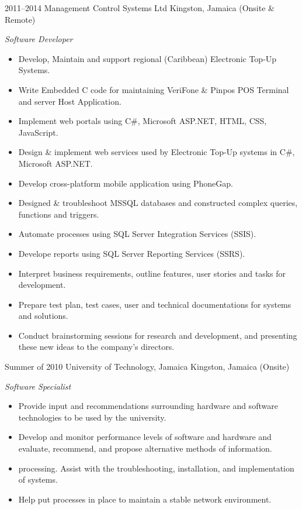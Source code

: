 \documentclass[]{friggeri-cvRS}
\begin{document}
\begin{entrylist}
{\begin{itemize}
    \end{itemize}}
  \entry
    {2011--2014}
    {Management Control Systems Ltd}
    {Kingston, Jamaica (Onsite \& Remote)}
    {\emph{Software Developer}
    \begin{itemize}
	\item Develop, Maintain and support regional (Caribbean) Electronic Top-Up Systems.
	\item Write Embedded C code for maintaining VeriFone \& Pinpos POS Terminal and server Host Application.
	\item Implement web portals using C\#, Microsoft ASP.NET, HTML, CSS, JavaScript.
	\item Design \& implement web services used by Electronic Top-Up systems in C\#, Microsoft ASP.NET.
	\item Develop cross-platform mobile application using PhoneGap.
	\item Designed \& troubleshoot MSSQL databases and constructed complex queries, functions and triggers.
	\item Automate processes using SQL Server Integration Services (SSIS).
	\item Develope reports using SQL Server Reporting Services (SSRS).
	\item Interpret business requirements, outline features, user stories and tasks for development.
	\item Prepare test plan, test cases, user and technical documentations for systems and solutions.
	\item Conduct brainstorming sessions for research and development, and presenting these new ideas to the company’s directors.\\
	 
    \end{itemize}}
  \entry
    {Summer of 2010}
    {University of Technology, Jamaica}
    {Kingston, Jamaica (Onsite)}
    {\emph{Software Specialist}
    \begin{itemize}
	\item Provide input and recommendations surrounding hardware and software technologies to be used by the university.
	\item Develop and monitor performance levels of software and hardware and evaluate, recommend, and propose alternative methods of information.		\item processing.  Assist with the troubleshooting, installation, and implementation of systems.
	\item Help put processes in place to maintain a stable network environment.
    \end{itemize}}
\end{entrylist}
\end{document}
